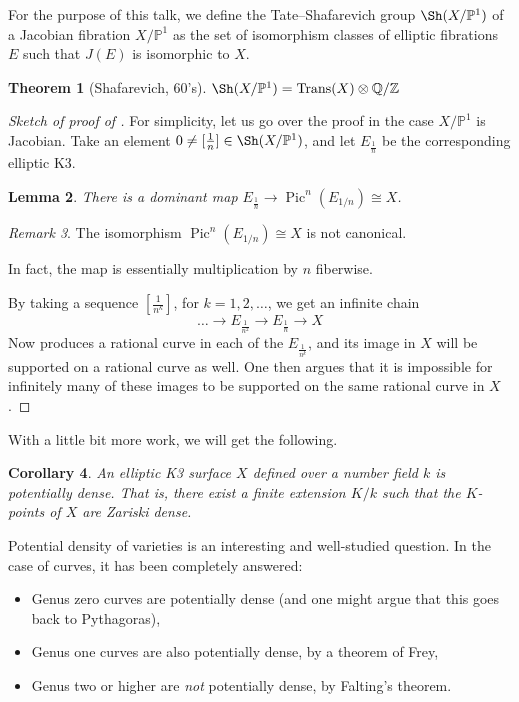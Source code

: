\documentclass{amsart}
\theoremstyle{plain}
\newtheorem{theorem}{Theorem}[section]
\newtheorem{lemma}[theorem]{Lemma}
\newtheorem{corollary}[theorem]{Corollary}
\theoremstyle{definition}
\theoremstyle{remark}
\newtheorem{remark}[theorem]{Remark}
\DeclareMathOperator{\Pic}{Pic}
\DeclareMathOperator{\Trans}{Trans}
\DeclareMathOperator{\Sha}{ \Sh }
\begin{document}
For the purpose of this talk, we define the Tate--Shafarevich group $\Sha(X/\mathbb{P}^1)$ of 
a Jacobian fibration $X/\mathbb{P}^1$ as the set of isomorphism classes of elliptic fibrations
$E$ such that $J(E)$ is isomorphic to $X$.

\begin{theorem}[Shafarevich, 60's]
$\Sha(X/\mathbb{P}^1)=\Trans(X) \otimes \mathbb{Q}/\mathbb{Z}$
\end{theorem} 


\begin{proof}[Sketch of proof of ]
For simplicity, let us go over the proof in the case $X/\mathbb{P}^1$ is Jacobian. Take
an element $0\neq [\frac{1}{n}] \in \Sha(X/\mathbb{P}^1)$, and let $E_{\frac{1}{n}}$ be the corresponding 
elliptic K3.
\begin{lemma}
There is a dominant map  $E_{\frac{1}{n}} \to \Pic^n(E_{1/n}) \cong X$.
\end{lemma}
\begin{remark}
The isomorphism $\Pic^n(E_{1/n}) \cong X$ is not canonical.
\end{remark}
In fact, the map is essentially multiplication by $n$ fiberwise.

By taking a sequence $[\frac{1}{n^k}]$, for $k=1,2,\ldots$, we get an infinite chain
\[
	\ldots  \to E_{\frac{1}{n^2}} \to E_{\frac{1}{n}} \to X
\]
Now  produces a rational curve in each of the $E_{\frac{1}{n^k}}$, and 
its image in $X$ will be supported on a rational curve as well. One then argues that it is impossible for infinitely many of these images to be supported on the same rational curve in $X$.
\end{proof}

With a little bit more work, we will get the following.
\begin{corollary}
\label{corollary:potential-density}
An elliptic K3 surface $X$ defined over a number field $k$ is potentially dense. That is,
there exist a finite extension $K/k$ such that the $K$-points of $X$ are Zariski dense.
\end{corollary}
Potential density of varieties is an interesting and well-studied question. In the case of curves, 
it has been completely answered:
\begin{itemize}
	\item Genus zero curves are potentially dense (and one might argue that this goes back to
	Pythagoras),
	\item Genus one curves are also potentially dense, by a theorem of Frey,
	\item Genus two or higher are \emph{not} potentially dense, by Falting's theorem. 
\end{itemize}
\end{document}
